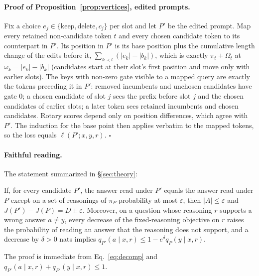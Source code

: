 \paragraph{Proof of Proposition~\ref{prop:vertices}, edited prompts.} Fix a choice $e_j\in\{\text{keep},\text{delete},c_j\}$
per slot and let $P'$ be the edited prompt. Map every retained non-candidate token
$t$ and every chosen candidate token to its counterpart in $P'$. Its position in
$P'$ is its base position plus the cumulative length change of the edits before
it, $\sum_{k\prec t}(|e_k|-|b_k|)$, which is exactly $\pi_t+\Omega_t$ at
$\omega_k=|e_k|-|b_k|$ (candidates start at their slot's first position and move
only with earlier slots). The keys with non-zero gate visible to a mapped query are
exactly the tokens preceding it in $P'$: removed incumbents and unchosen
candidates have gate $0$; a chosen candidate of slot $j$ sees the prefix before
slot $j$ and the chosen candidates of earlier slots; a later token sees retained
incumbents and chosen candidates. Rotary scores depend only on position
differences, which agree with $P'$. The induction for the base point then applies
verbatim to the mapped tokens, so the loss equals $\ell(P';x,y,r)$. \hfill$\square$

\paragraph{Faithful reading.} The statement summarized in \S\ref{sec:theory}:

\begin{proposition}
\label{prop:faithful}
If, for every candidate $P'$, the answer read under $P'$ equals the answer read under $P$ except
on a set of reasonings of $\pi_P$-probability at most $\varepsilon$, then $|A|\le\varepsilon$ and
$J(P')-J(P)=D\pm\varepsilon$. Moreover, on a question whose reasoning $r$ supports a wrong answer
$a\neq y$, every decrease of the fixed-reasoning objective on $r$ raises the probability of reading
an answer that the reasoning does not support, and a decrease by $\delta>0$ nats implies
$q_{P'}(a\mid x,r)\le1-e^{\delta}q_P(y\mid x,r)$.
\end{proposition}

The proof is immediate from Eq.~\ref{eq:decomp} and $q_{P'}(a\mid x,r)+q_{P'}(y\mid x,r)\le1$.

